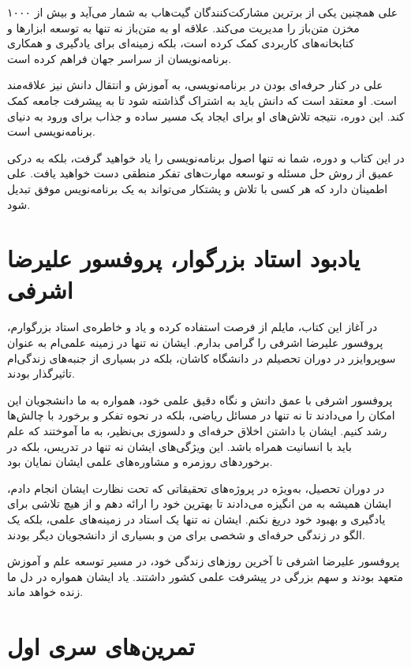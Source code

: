 \documentclass[b5paper,12pt]{article}
\begin{document}
	علی همچنین یکی از برترین مشارکت‌کنندگان گیت‌هاب به شمار می‌آید و بیش از ۱۰۰۰ مخزن متن‌باز را مدیریت می‌کند. علاقه او به متن‌باز نه تنها به توسعه ابزارها و کتابخانه‌های کاربردی کمک کرده است، بلکه زمینه‌ای برای یادگیری و همکاری برنامه‌نویسان از سراسر جهان فراهم کرده است.
	
	علی در کنار حرفه‌ای بودن در برنامه‌نویسی، به آموزش و انتقال دانش نیز علاقه‌مند است. او معتقد است که دانش باید به اشتراک گذاشته شود تا به پیشرفت جامعه کمک کند. این دوره، نتیجه تلاش‌های او برای ایجاد یک مسیر ساده و جذاب برای ورود به دنیای برنامه‌نویسی است. 
	
	در این کتاب و دوره، شما نه تنها اصول برنامه‌نویسی را یاد خواهید گرفت، بلکه به درکی عمیق از روش حل مسئله و توسعه مهارت‌های تفکر منطقی دست خواهید یافت. علی اطمینان دارد که هر کسی با تلاش و پشتکار می‌تواند به یک برنامه‌نویس موفق تبدیل شود.
	
	
	\newpage
	
	\section*{یادبود استاد بزرگوار، پروفسور علیرضا اشرفی}
	
	در آغاز این کتاب، مایلم از فرصت استفاده کرده و یاد و خاطره‌ی استاد بزرگوارم، پروفسور علیرضا اشرفی را گرامی بدارم. ایشان نه تنها در زمینه علمی‌ام به عنوان سوپروایزر در دوران تحصیلم در دانشگاه کاشان، بلکه در بسیاری از جنبه‌های زندگی‌ام تاثیرگذار بودند.
	
	پروفسور اشرفی با عمق دانش و نگاه دقیق علمی‌ خود، همواره به ما دانشجویان این امکان را می‌دادند تا نه تنها در مسائل ریاضی، بلکه در نحوه تفکر و برخورد با چالش‌ها رشد کنیم. ایشان با داشتن اخلاق حرفه‌ای و دلسوزی بی‌نظیر، به ما آموختند که علم باید با انسانیت همراه باشد. این ویژگی‌های ایشان نه تنها در تدریس، بلکه در برخوردهای روزمره‌ و مشاوره‌های علمی‌ ایشان نمایان بود.
	
	در دوران تحصیل، به‌ویژه در پروژه‌های تحقیقاتی که تحت نظارت ایشان انجام دادم، ایشان همیشه به من انگیزه می‌دادند تا بهترین خود را ارائه دهم و از هیچ تلاشی برای یادگیری و بهبود خود دریغ نکنم. ایشان نه تنها یک استاد در زمینه‌های علمی، بلکه یک الگو در زندگی حرفه‌ای و شخصی برای من و بسیاری از دانشجویان دیگر بودند.
	
	پروفسور علیرضا اشرفی تا آخرین روزهای زندگی‌ خود، در مسیر توسعه علم و آموزش متعهد بودند و سهم بزرگی در پیشرفت علمی کشور داشتند. یاد ایشان همواره در دل ما زنده خواهد ماند.
	
	
	\newpage
	\section*{تمرین‌های سری اول}
	
\end{document}
